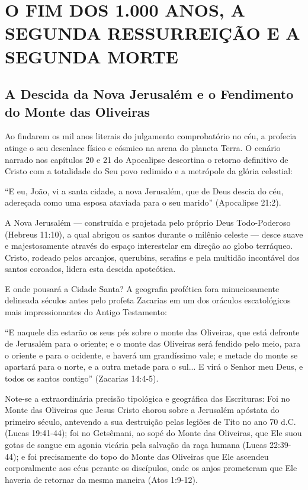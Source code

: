 \documentclass[11pt,a4paper,openany]{book}
\begin{document}
\section{O FIM DOS 1.000 ANOS, A SEGUNDA RESSURREIÇÃO E A SEGUNDA MORTE}



\subsection{A Descida da Nova Jerusalém e o Fendimento do Monte das Oliveiras}


Ao findarem os mil anos literais do julgamento comprobatório no céu, a profecia atinge o seu desenlace físico e cósmico na arena do planeta Terra. O cenário narrado nos capítulos 20 e 21 do Apocalipse descortina o retorno definitivo de Cristo com a totalidade do Seu povo redimido e a metrópole da glória celestial:

``E eu, João, vi a santa cidade, a nova Jerusalém, que de Deus descia do céu, adereçada como uma esposa ataviada para o seu marido'' (Apocalipse 21:2).

A Nova Jerusalém — construída e projetada pelo próprio Deus Todo-Poderoso (Hebreus 11:10), a qual abrigou os santos durante o milênio celeste — desce suave e majestosamente através do espaço interestelar em direção ao globo terráqueo. Cristo, rodeado pelos arcanjos, querubins, serafins e pela multidão incontável dos santos coroados, lidera esta descida apoteótica.

E onde pousará a Cidade Santa?
A geografia profética fora minuciosamente delineada séculos antes pelo profeta Zacarias em um dos oráculos escatológicos mais impressionantes do Antigo Testamento:

``E naquele dia estarão os seus pés sobre o monte das Oliveiras, que está defronte de Jerusalém para o oriente; e o monte das Oliveiras será fendido pelo meio, para o oriente e para o ocidente, e haverá um grandíssimo vale; e metade do monte se apartará para o norte, e a outra metade para o sul... E virá o Senhor meu Deus, e todos os santos contigo'' (Zacarias 14:4-5).

Note-se a extraordinária precisão tipológica e geográfica das Escrituras:
Foi no Monte das Oliveiras que Jesus Cristo chorou sobre a Jerusalém apóstata do primeiro século, antevendo a sua destruição pelas legiões de Tito no ano 70 d.C. (Lucas 19:41-44); foi no Getsêmani, ao sopé do Monte das Oliveiras, que Ele suou gotas de sangue em agonia vicária pela salvação da raça humana (Lucas 22:39-44); e foi precisamente do topo do Monte das Oliveiras que Ele ascendeu corporalmente aos céus perante os discípulos, onde os anjos prometeram que Ele haveria de retornar da mesma maneira (Atos 1:9-12).
\end{document}
